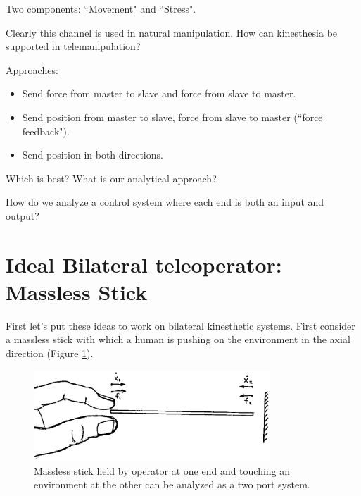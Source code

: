 Two components:  ``Movement" and ``Stress".

Clearly this channel is used in natural manipulation.    How can kinesthesia be supported in telemanipulation?



Approaches:
\begin{itemize}

\item Send force from master to slave and force from slave to master.
\item Send position from master to slave, force from slave to master (``force feedback").
\item Send position in both directions.

\end{itemize}

Which is best?   What is our analytical approach?

How do we analyze a control system where each end is both an input and output?





\section{Ideal Bilateral teleoperator: Massless Stick}

First let's put these ideas to work on bilateral kinesthetic systems.    First consider a massless stick with which a human is pushing on the environment  in the axial direction (Figure \ref{MasslessStick}).


\begin{figure}[h]	%
 \centering \includegraphics[width=3.5in]{figs14/00312.eps}
\caption{Massless stick held by operator at one end and touching an environment at the other can be analyzed as a two port system.}\label{MasslessStick}	%
\end{figure}	%


